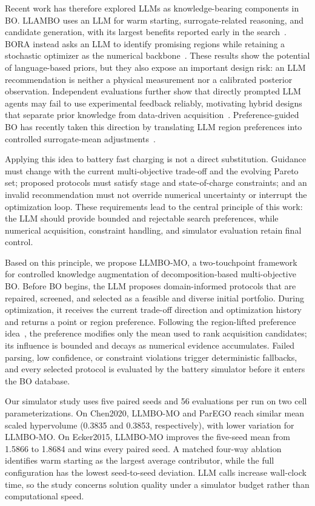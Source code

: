 \documentclass[journal]{IEEEtran}
\begin{document}
Recent work has therefore explored LLMs as knowledge-bearing components in BO. LLAMBO uses an LLM for warm starting, surrogate-related reasoning, and candidate generation, with its largest benefits reported early in the search~\cite{ref9}. BORA instead asks an LLM to identify promising regions while retaining a stochastic optimizer as the numerical backbone~\cite{ref10}. These results show the potential of language-based priors, but they also expose an important design risk: an LLM recommendation is neither a physical measurement nor a calibrated posterior observation. Independent evaluations further show that directly prompted LLM agents may fail to use experimental feedback reliably, motivating hybrid designs that separate prior knowledge from data-driven acquisition~\cite{ref16}. Preference-guided BO has recently taken this direction by translating LLM region preferences into controlled surrogate-mean adjustments~\cite{ref17}.

Applying this idea to battery fast charging is not a direct substitution. Guidance must change with the current multi-objective trade-off and the evolving Pareto set; proposed protocols must satisfy stage and state-of-charge constraints; and an invalid recommendation must not override numerical uncertainty or interrupt the optimization loop. These requirements lead to the central principle of this work: the LLM should provide bounded and rejectable search preferences, while numerical acquisition, constraint handling, and simulator evaluation retain final control.

Based on this principle, we propose LLMBO-MO, a two-touchpoint framework for controlled knowledge augmentation of decomposition-based multi-objective BO. Before BO begins, the LLM proposes domain-informed protocols that are repaired, screened, and selected as a feasible and diverse initial portfolio. During optimization, it receives the current trade-off direction and optimization history and returns a point or region preference. Following the region-lifted preference idea~\cite{ref17}, the preference modifies only the mean used to rank acquisition candidates; its influence is bounded and decays as numerical evidence accumulates. Failed parsing, low confidence, or constraint violations trigger deterministic fallbacks, and every selected protocol is evaluated by the battery simulator before it enters the BO database.

Our simulator study uses five paired seeds and 56 evaluations per run on two cell parameterizations. On Chen2020, LLMBO-MO and ParEGO reach similar mean scaled hypervolume (0.3835 and 0.3853, respectively), with lower variation for LLMBO-MO. On Ecker2015, LLMBO-MO improves the five-seed mean from 1.5866 to 1.8684 and wins every paired seed. A matched four-way ablation identifies warm starting as the largest average contributor, while the full configuration has the lowest seed-to-seed deviation. LLM calls increase wall-clock time, so the study concerns solution quality under a simulator budget rather than computational speed.
\end{document}
